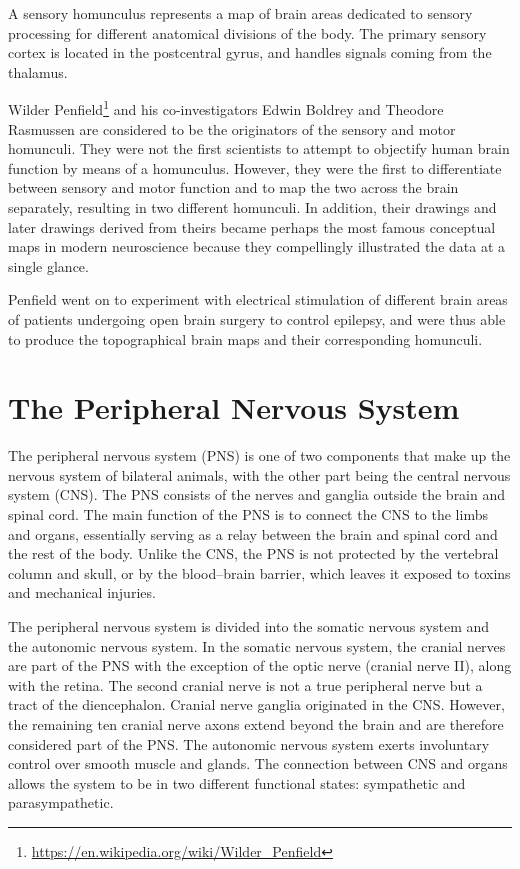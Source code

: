 \documentclass[]{book}
\let\rmarkdownfootnote\footnote%
\def\footnote{\protect\rmarkdownfootnote}
\renewcommand{\href}[2]{#2\footnote{\url{#1}}}
\begin{document}
A sensory homunculus represents a map of brain areas dedicated to sensory processing for different anatomical divisions of the body. The primary sensory cortex is located in the postcentral gyrus, and handles signals coming from the thalamus.

\href{https://en.wikipedia.org/wiki/Wilder_Penfield}{Wilder Penfield} and his co-investigators Edwin Boldrey and Theodore Rasmussen are considered to be the originators of the sensory and motor homunculi. They were not the first scientists to attempt to objectify human brain function by means of a homunculus. However, they were the first to differentiate between sensory and motor function and to map the two across the brain separately, resulting in two different homunculi. In addition, their drawings and later drawings derived from theirs became perhaps the most famous conceptual maps in modern neuroscience because they compellingly illustrated the data at a single glance.

Penfield went on to experiment with electrical stimulation of different brain areas of patients undergoing open brain surgery to control epilepsy, and were thus able to produce the topographical brain maps and their corresponding homunculi.

\hypertarget{the-peripheral-nervous-system}{%
\chapter{The Peripheral Nervous System}\label{the-peripheral-nervous-system}}

The peripheral nervous system (PNS) is one of two components that make up the nervous system of bilateral animals, with the other part being the central nervous system (CNS). The PNS consists of the nerves and ganglia outside the brain and spinal cord. The main function of the PNS is to connect the CNS to the limbs and organs, essentially serving as a relay between the brain and spinal cord and the rest of the body. Unlike the CNS, the PNS is not protected by the vertebral column and skull, or by the blood--brain barrier, which leaves it exposed to toxins and mechanical injuries.

The peripheral nervous system is divided into the somatic nervous system and the autonomic nervous system. In the somatic nervous system, the cranial nerves are part of the PNS with the exception of the optic nerve (cranial nerve II), along with the retina. The second cranial nerve is not a true peripheral nerve but a tract of the diencephalon. Cranial nerve ganglia originated in the CNS. However, the remaining ten cranial nerve axons extend beyond the brain and are therefore considered part of the PNS. The autonomic nervous system exerts involuntary control over smooth muscle and glands. The connection between CNS and organs allows the system to be in two different functional states: sympathetic and parasympathetic.
\end{document}
